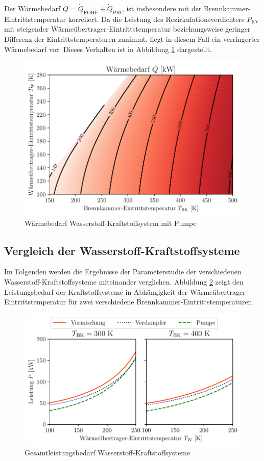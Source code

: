 Der Wärmebedarf $\dot{Q}=\dot{Q}_\mathrm{FOHE}+\dot{Q}_\mathrm{PHC}$ ist insbesondere mit der Brennkammer-Eintrittstemperatur korreliert. Da die Leistung des Rezirkulationsverdichters $P_\mathrm{RV}$ mit steigender Wärmeübertrager-Eintrittstemperatur beziehungsweise geringer Differenz der Eintrittstemperaturen zunimmt, liegt in diesem Fall ein verringerter Wärmebedarf vor. Dieses Verhalten ist in Abbildung \ref{fig:pumpheat} dargestellt.

\begin{figure}[ht]
\centering
\includegraphics[width=0.8\linewidth]{4_Abbildungen/2_Hauptteil/Ergebnisse/Pumpeheatcontour.pdf}
  \caption{Wärmebedarf Wasserstoff-Kraftstoffsystem mit Pumpe}
  \label{fig:pumpheat}
\end{figure}
\FloatBarrier


\subsection{Vergleich der Wasserstoff-Kraftstoffsysteme}

Im Folgenden werden die Ergebnisse der Parameterstudie der verschiedenen Wasserstoff-Kraftstoffsysteme miteinander verglichen. Abbildung \ref{fig:comp_power} zeigt den Leistungsbedarf der Kraftstoffsysteme in Abhängigkeit der Wärmeübertrager-Eintrittstemperatur für zwei verschiedene Brennkammer-Eintrittstemperaturen.

\begin{figure}[ht]
\centering
\includegraphics[width=0.8\linewidth]{4_Abbildungen/2_Hauptteil/Ergebnisse/summary_power.pdf}
  \caption{Gesamtleistungsbedarf Wasserstoff-Kraftstoffsysteme}
  \label{fig:comp_power}
\end{figure}
\FloatBarrier

